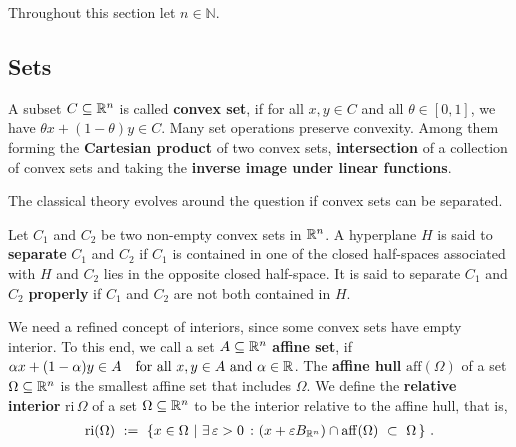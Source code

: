 Throughout this section let $n\in\mathbb{N}$.
\subsection*{Sets}
A subset $C\subseteq \mathbb{R}^n$ is called \textbf{convex set}, 
if for all $x,y\in C$ and all $\theta\in [0,1]$,
we have 
$
  \theta x + (1-\theta)y 
  \in
  C
$.
Many set operations preserve convexity. Among them
forming the 
\textbf{Cartesian product} of two convex sets, 
\textbf{intersection} of a collection of convex sets and 
taking the \textbf{inverse image under linear functions}.

The classical theory evolves around the question 
if convex sets can be separated.
\begin{definition*}
  Let 
  $C_1$ and $C_2$
  be two non-empty convex sets in $\mathbb{R}^n$. 
  A hyperplane $H$ is said to \textbf{separate}
  $C_1$ and $C_2$
  if $C_1$ is contained in one of the closed half-spaces associated with
  $H$ and $C_2$ lies in the opposite closed half-space. It is said to separate 
  $C_1$ and $C_2$
  \textbf{properly} if 
  $C_1$ and $C_2$
  are not both contained in $H$.
\end{definition*}

We need a refined concept of interiors, since some convex sets have empty interior. To this end, 
  we call a set
  $A\subseteq \mathbb{R}^n$ 
  \textbf{affine set}, if
  $
    \alpha x + (1-\alpha)y \in A
    \quad
    \text{for all}
    \ 
    x,y \in A
    \ 
    \text{and}
    \ 
    \alpha \in \R
  $.
  The \textbf{affine hull} 
  $\mathrm{aff}(\Omega)$
  of a set 
  $\Omega\subseteq \mathbb{R}^n$
  is the smallest affine set that includes $\Omega$.
  We define the \textbf{relative interior} $\mathrm{ri}\,\Omega$ 
  of a set 
  $\Omega\subseteq \mathbb{R}^n$
  to be the interior relative to the affine hull, that is,
    \begin{gather}
    \mathrm{ri}(\Omega)
    \ 
    :=
    \ 
    \left\{ 
      x \in \Omega 
      \ 
      |
      \ 
      \exists
      \,
      \varepsilon > 0\ 
      \colon
      (
      x+\varepsilon B_{\R^n}
      )
      \cap
      \mathrm{aff}(\Omega)
      \ 
      \subset
      \ 
      \Omega
      \,
    \right\}
    \,.
  \end{gather}

